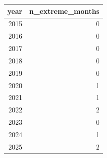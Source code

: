 \begin{tabular}{rr}
\toprule
year & n\_extreme\_months \\
\midrule
2015 & 0 \\
2016 & 0 \\
2017 & 0 \\
2018 & 0 \\
2019 & 0 \\
2020 & 1 \\
2021 & 1 \\
2022 & 2 \\
2023 & 0 \\
2024 & 1 \\
2025 & 2 \\
\bottomrule
\end{tabular}
